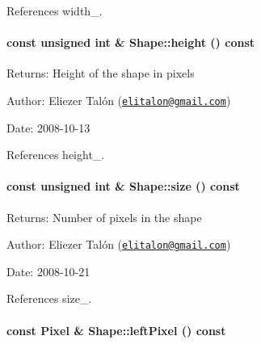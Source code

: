 References width\_\-.\hypertarget{class_shape_8400155046b2190bce621f8f366ef2be}{
\paragraph[height]{\setlength{\rightskip}{0pt plus 5cm}const unsigned int \& Shape::height () const}\hfill}
\label{class_shape_8400155046b2190bce621f8f366ef2be}


\begin{Desc}
\item[Returns:]Height of the shape in pixels\end{Desc}
\begin{Desc}
\item[Author:]Eliezer Talón (\href{mailto:elitalon@gmail.com}{\tt elitalon@gmail.com}) \end{Desc}
\begin{Desc}
\item[Date:]2008-10-13 \end{Desc}


References height\_\-.\hypertarget{class_shape_8504d3be338d2fa594c35fe1444a9ed8}{
\paragraph[size]{\setlength{\rightskip}{0pt plus 5cm}const unsigned int \& Shape::size () const}\hfill}
\label{class_shape_8504d3be338d2fa594c35fe1444a9ed8}


\begin{Desc}
\item[Returns:]Number of pixels in the shape\end{Desc}
\begin{Desc}
\item[Author:]Eliezer Talón (\href{mailto:elitalon@gmail.com}{\tt elitalon@gmail.com}) \end{Desc}
\begin{Desc}
\item[Date:]2008-10-21 \end{Desc}


References size\_\-.\hypertarget{class_shape_53d49d362234068aad0b80986fabb85d}{
\paragraph[leftPixel]{\setlength{\rightskip}{0pt plus 5cm}const {\bf Pixel} \& Shape::leftPixel () const}\hfill}
\label{class_shape_53d49d362234068aad0b80986fabb85d}


